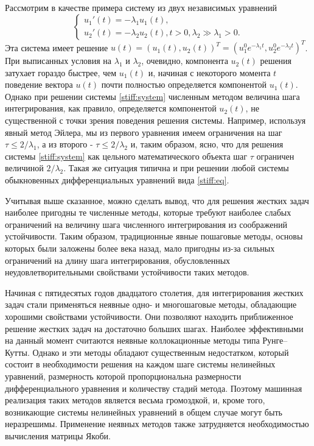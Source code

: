 \documentclass[a4paper,12pt]{report}
\begin{document}
  
  Рассмотрим в качестве примера систему из двух независимых уравнений   
  \begin{equation}
  \label{stiff:system}
  \begin{cases}
   u_1'(t)=-\lambda_1 u_1(t), 
   \\
    u_2'(t)=-\lambda_2 u_2(t), t>0, \lambda_2 \gg \lambda_1 > 0.
  \end{cases}
  \end{equation}
  Эта система имеет решение $u(t)=(u_1(t), u_2(t))^T = (u_1^0 e^{-\lambda_1 t}, u_2^0 e^{-\lambda_2 t})^T$. При выписанных условия на $\lambda_1$ и $\lambda_2$, очевидно, компонента $u_2(t)$ решения затухает гораздо быстрее, чем $u_1(t)$ и, начиная с некоторого момента $t$ поведение вектора $u(t)$ почти полностью определяется компонентой $u_1(t)$. Однако при решении системы \eqref{stiff:system} численным методом величина шага интегрирования, как правило, определяется компонентой $u_2(t)$, не существенной с точки зрения поведения решения системы. Например, используя явный метод Эйлера, мы из первого уравнения имеем ограничения на шаг $\tau \le 2/\lambda_1$, а из второго - $\tau \le 2/\lambda_2$ и, таким образом, ясно, что для решения системы \eqref{stiff:system} как цельного математического объекта шаг $\tau$ ограничен величиной $2/\lambda_2$. Такая же ситуация типична и при решении любой системы обыкновенных дифференциальных уравнений вида \eqref{stiff:eq}.
  
Учитывая выше сказанное, можно сделать вывод, что для решения жестких задач наиболее пригодны те численные методы, которые требуют наиболее слабых ограничений на величину шага численного интегрирования из соображений устойчивости. Таким образом, традиционные явные пошаговые методы, основы которых были заложены более века назад, мало пригодны из-за сильных ограничений на длину шага интегрирования, обусловленных неудовлетворительными свойствами устойчивости таких методов. 

 
 Начиная с пятидесятых годов двадцатого столетия, для интегрирования жестких задач стали применяться неявные одно- и многошаговые методы, обладающие хорошими свойствами устойчивости. Они позволяют находить приближенное решение жестких задач на достаточно больших шагах. Наиболее эффективными на данный момент считаются неявные коллокационные методы типа Рунге–Кутты. Однако и эти методы обладают существенным недостатком, который состоит в необходимости решения на каждом шаге системы нелинейных уравнений, размерность которой пропорциональна размерности дифференциального уравнения и количеству стадий метода. Поэтому машинная реализация таких методов является весьма громоздкой, и, кроме того, возникающие системы нелинейных уравнений в общем случае могут быть неразрешимы. Применение неявных методов также затрудняется необходимостью вычисления матрицы Якоби.
 
\end{document}
